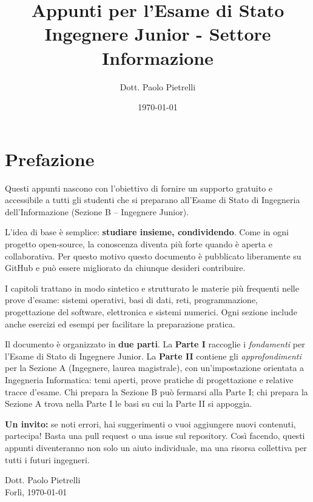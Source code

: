 \documentclass[a4paper,12pt,openright,twoside]{book}
\title{Appunti per l'Esame di Stato\\Ingegnere Junior - Settore Informazione}
\author{Dott. Paolo Pietrelli}
\date{\today}
\begin{document}
\FrontCoverPage

\frontmatter

\cleardoublepage
\maketitle
\cleardoublepage

\cleardoublepage
\chapter*{Prefazione}

Questi appunti nascono con l’obiettivo di fornire un supporto
gratuito e accessibile a tutti gli studenti che si preparano
all’Esame di Stato di Ingegneria dell’Informazione (Sezione B – Ingegnere Junior).

L’idea di base è semplice: \textbf{studiare insieme, condividendo}.
Come in ogni progetto open-source, la conoscenza diventa più
forte quando è aperta e collaborativa. Per questo motivo
questo documento è pubblicato liberamente su GitHub e può
essere migliorato da chiunque desideri contribuire.

I capitoli trattano in modo sintetico e strutturato le materie
più frequenti nelle prove d’esame: sistemi operativi, basi di dati,
reti, programmazione, progettazione del software, elettronica e
sistemi numerici. Ogni sezione include anche esercizi ed esempi
per facilitare la preparazione pratica.

Il documento è organizzato in \textbf{due parti}. La \textbf{Parte I}
raccoglie i \emph{fondamenti} per l'Esame di Stato di Ingegnere Junior.
La \textbf{Parte II} contiene gli \emph{approfondimenti} per la Sezione A
(Ingegnere, laurea magistrale), con un'impostazione orientata a
Ingegneria Informatica: temi aperti, prove pratiche di progettazione e
relative tracce d'esame. Chi prepara la Sezione B può fermarsi alla
Parte I; chi prepara la Sezione A trova nella Parte I le basi su cui la
Parte II si appoggia.

\medskip
\noindent
\textbf{Un invito:} se noti errori, hai suggerimenti o vuoi aggiungere
nuovi contenuti, partecipa! Basta una pull request o una issue sul repository.
Così facendo, questi appunti diventeranno non solo un aiuto individuale,
ma una risorsa collettiva per tutti i futuri ingegneri.

\bigskip
\begin{flushright}
Dott. Paolo Pietrelli \\
Forlì, \today
\end{flushright}
\end{document}
